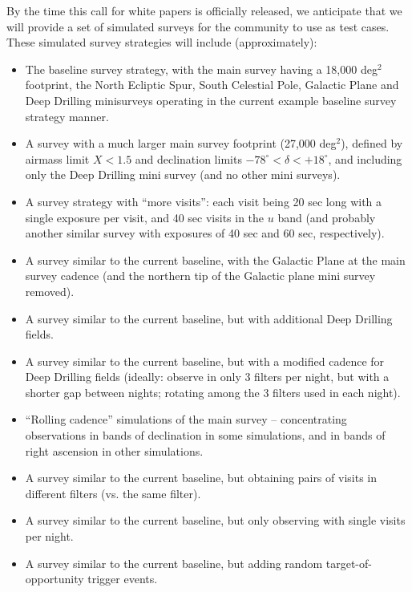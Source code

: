 \documentclass[DM,lsstdraft,toc,usenatbib]{lsstdoc}
\begin{document}
By the time this call for white papers is officially released, we anticipate that we will provide a set of
simulated surveys for the community to use as test cases. These simulated survey strategies will include (approximately): 
\begin{itemize}
\item The baseline survey strategy, with the main survey having a 18,000 deg$^2$ footprint, the North Ecliptic Spur, South Celestial Pole, Galactic Plane and Deep Drilling minisurveys operating in the current example baseline survey strategy manner. 
\item A survey with a much larger main survey footprint (27,000 deg$^2$), defined by airmass limit $X<1.5$ and declination limits 
$-78^\circ< \delta < +18^\circ$, and including only the Deep Drilling mini survey (and no other mini surveys).
\item A survey strategy with ``more visits'': each visit being 20 sec long with a single exposure per visit, and 40 sec visits in the $u$ band (and probably another similar survey with exposures of 40 sec and 60 sec, respectively). 
\item A survey similar to the current baseline, with the Galactic Plane at the main survey cadence (and the northern tip of the Galactic plane mini survey removed).
\item A survey similar to the current baseline, but with additional Deep Drilling fields.
\item A survey similar to the current baseline, but with a modified cadence for Deep Drilling fields (ideally: observe in only 3 filters per night, but with a shorter gap between nights; rotating among the 3 filters used in each night).
\item ``Rolling cadence'' simulations of the main survey -- concentrating observations in bands of declination in some simulations, and in bands of 
right ascension  in other simulations. 
\item A survey similar to the current baseline, but obtaining pairs of visits in different filters (vs. the same filter).
\item A survey similar to the current baseline, but only observing with single visits per night.
\item A survey similar to the current baseline, but adding random target-of-opportunity trigger events.
\end{itemize}
\end{document}
